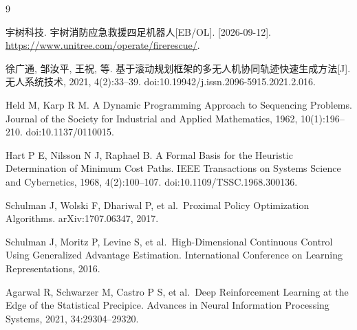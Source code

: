 \begin{thebibliography}{9}
\small\setlength{\itemsep}{8pt}

 \begingroup\raggedright
 宇树科技. 宇树消防应急救援四足机器人[EB/OL]. [2026-09-12]. \url{https://www.unitree.com/operate/firerescue/}.
 \par\endgroup

 徐广通, 邹汝平, 王祝, 等. 基于滚动规划框架的多无人机协同轨迹快速生成方法[J]. 无人系统技术, 2021, 4(2):33--39. doi:10.19942/j.issn.2096-5915.2021.2.016.

 Held M, Karp R M. A Dynamic Programming Approach to Sequencing Problems. Journal of the Society for Industrial and Applied Mathematics, 1962, 10(1):196--210. doi:10.1137/0110015.

 Hart P E, Nilsson N J, Raphael B. A Formal Basis for the Heuristic Determination of Minimum Cost Paths. IEEE Transactions on Systems Science and Cybernetics, 1968, 4(2):100--107. doi:10.1109/TSSC.1968.300136.

 Schulman J, Wolski F, Dhariwal P, et al.~Proximal Policy Optimization Algorithms. arXiv:1707.06347, 2017.

 Schulman J, Moritz P, Levine S, et al.~High-Dimensional Continuous Control Using Generalized Advantage Estimation. International Conference on Learning Representations, 2016.

 Agarwal R, Schwarzer M, Castro P S, et al.~Deep Reinforcement Learning at the Edge of the Statistical Precipice. Advances in Neural Information Processing Systems, 2021, 34:29304--29320.

\end{thebibliography}



\clearpage

